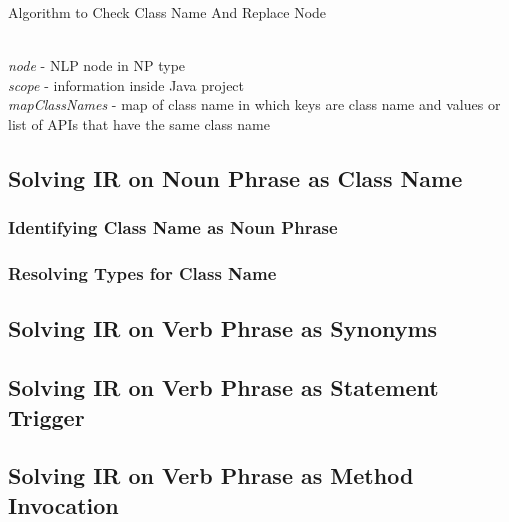 \begin{algorithm}
	\caption{Algorithm to Check Class Name And Replace Node}
	\label{alg:checkClassName}
	\begin{algorithmic}
		\Require \\
		\textit{node} - NLP node in NP type	\\
		\textit{scope} - information inside Java project \\
		\textit{mapClassNames} - map of class name in which keys are class name and values or list of APIs that have the same class name
		\EndIf	
		\EndFunction	
		\end{algorithmic}
	\end{algorithm}


\subsection{Solving IR on Noun Phrase as Class Name}
\subsubsection{Identifying  Class Name as Noun Phrase}
\subsubsection{Resolving Types for  Class Name}
\subsection{Solving IR on Verb Phrase as Synonyms}
\subsection{Solving IR on Verb Phrase as Statement Trigger}
\subsection{Solving IR on Verb Phrase as Method Invocation}
